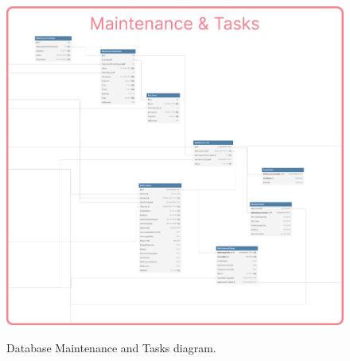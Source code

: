 \begin{figure}[h]
  \caption{Database Maintenance and Tasks diagram.}
  \centering
  \includegraphics[width=\textwidth]{figs/dbDiagrams/Maintenance_and_Tasks}
  \label{fig:figure2}
\end{figure}


